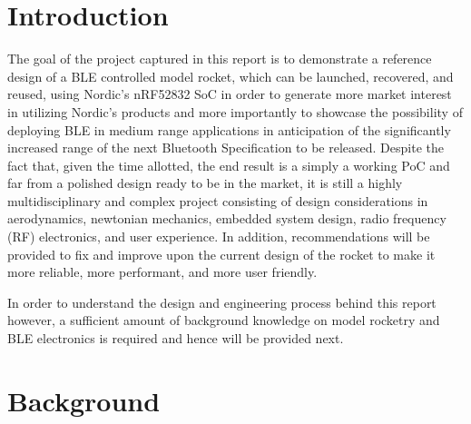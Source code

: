 \documentclass{workreport}
\begin{document}


\begin{body}

\section{Introduction}

	The goal of the project captured in this report is to demonstrate a reference design of a BLE controlled model rocket, which can be launched, recovered, and reused, using Nordic's nRF52832 SoC in order to generate more market interest in utilizing Nordic's products and more importantly to showcase the possibility of deploying BLE in medium range applications in anticipation of the significantly increased range of the next Bluetooth Specification to be released. Despite the fact that, given the time allotted, the end result is a simply a working PoC and far from a polished design ready to be in the market, it is still a highly multidisciplinary and complex project consisting of design considerations in aerodynamics, newtonian mechanics, embedded system design, radio frequency (RF) electronics, and user experience. In addition, recommendations will be provided to fix and improve upon the current design of the rocket to make it more reliable, more performant, and more user friendly.

	In order to understand the design and engineering process behind this report however, a sufficient amount of background knowledge on model rocketry and BLE electronics is required and hence will be provided next.

\section{Background}


\end{body}
\end{document}
